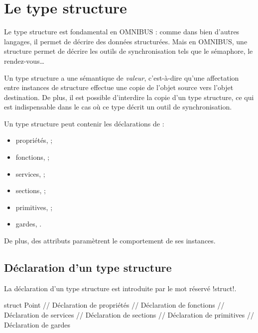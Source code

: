 




\chapter{Le type structure}


Le type structure est fondamental en OMNIBUS : comme dans bien d'autres langages, il permet de décrire des données structurées. Mais en OMNIBUS, une structure permet de décrire les outils de synchronisation tels que le sémaphore, le rendez-vous…

Un type structure a une sémantique de \emph{valeur}, c'est-à-dire qu'une affectation entre instances de structure effectue une copie de l'objet source vers l'objet destination. De plus, il est possible d'interdire la copie d'un type structure, ce qui est indispensable dans le cas où ce type décrit un outil de synchronisation.

Un type structure peut contenir les déclarations de :
\begin{itemize}
\item propriétés,  ;
\item fonctions,  ;
\item services,  ;
\item sections,  ;
\item primitives,  ;
\item gardes, .
\end{itemize}

De plus, des attributs paramètrent le comportement de ses instances.











\section{Déclaration d'un type structure}

La déclaration d'un type structure est introduite par le mot réservé \omnibus!struct!.

\begin{OMNIBUS}
struct Point {
  // Déclaration de propriétés
  // Déclaration de fonctions
  // Déclaration de services
  // Déclaration de sections
  // Déclaration de primitives
  // Déclaration de gardes
}
\end{OMNIBUS}

